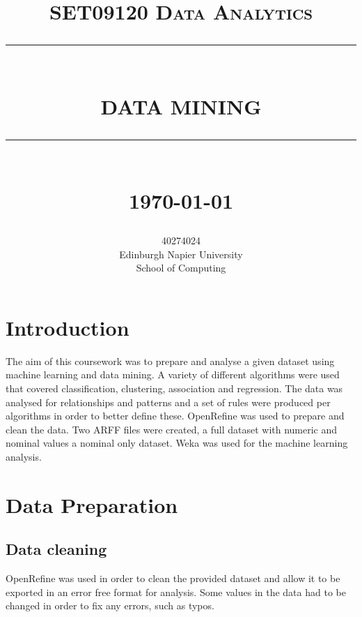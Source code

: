 \documentclass[12pt]{article}
\newcommand{\HRule}[1]{\rule{\linewidth}{#1}}
\begin{document}
\title{ \normalsize \textsc{SET09120 Data Analytics}
		\\ [2.0cm]
		\HRule{0.5pt} \\
		\LARGE \textbf{\uppercase{Data Mining}}
		\HRule{2pt} \\ [0.5cm]
		\normalsize \monthyeardate\today \vspace*{5\baselineskip}}

\author{
		40274024 \\ 
		Edinburgh Napier University \\
		School of Computing 
		\date{}}

\maketitle

\newpage

\sectionfont{\scshape}


\section{Introduction}
The aim of this coursework was to prepare and analyse a given dataset using machine learning and data mining. A variety of different algorithms were used that covered classification, clustering, association and regression. The data was analysed for relationships and patterns and a set of rules were produced per algorithms in order to better define these. OpenRefine was used to prepare and clean the data. Two ARFF files were created, a full dataset with numeric and nominal values a nominal only dataset. Weka was used for the machine learning analysis.


\section{Data Preparation}
\subsection{Data cleaning}
OpenRefine was used in order to clean the provided dataset and allow it to be exported in an error free format for analysis.
Some values in the data had to be changed in order to fix any errors, such as typos.
\end{document}

